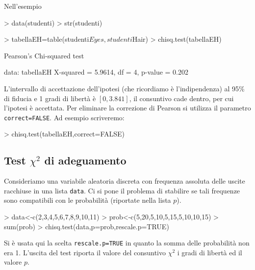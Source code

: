 \documentclass[onecolumn,12pt]{book}
\begin{document}
Nell'esempio
\begin{Schunk}
\begin{Sinput}
> data(studenti)
> str(studenti)
\end{Sinput}
\begin{Sinput}
> tabellaEH=table(studenti$Eyes,studenti$Hair)
> chisq.test(tabellaEH)
\end{Sinput}
\begin{Soutput}
	Pearson's Chi-squared test

data:  tabellaEH
X-squared = 5.9614, df = 4, p-value = 0.202
\end{Soutput}
\end{Schunk}
L'intervallo di accettazione dell'ipotesi (che ricordiamo \`e l'indipendenza) al 95\% di fiducia e 1 gradi di libert\`a \`e  $[0, 3.841]$, il consuntivo cade dentro, per cui l'ipotesi \`e accettata.
Per eliminare la correzione di Pearson si utilizza il parametro  \texttt{correct=FALSE}.
Ad esempio scriveremo:
\begin{Schunk}
\begin{Sinput}
> chisq.test(tabellaEH,correct=FALSE)
\end{Sinput}
\end{Schunk}

\subsection{Test $\chi^2$  di adeguamento}
Consideriamo una variabile aleatoria discreta con frequenza assoluta delle uscite racchiuse in una lista \texttt{data}. Ci si pone il problema di stabilire se tali frequenze sono compatibili con le probabilit\`a (riportate nella lista $p$).
\begin{Schunk}
\begin{Sinput}
> data<-c(2,3,4,5,6,7,8,9,10,11)
> prob<-c(5,20,5,10,5,15,5,10,10,15)
> sum(prob)
> chisq.test(data,p=prob,rescale.p=TRUE)
\end{Sinput}
\end{Schunk}
Si \`e usata qui la scelta \texttt{rescale.p=TRUE} in quanto la somma delle  probabilit\`a non era 1.
L'uscita del test riporta il valore del consuntivo $\chi^2$ i gradi di libert\`a ed il valore $p$.
\end{document}
